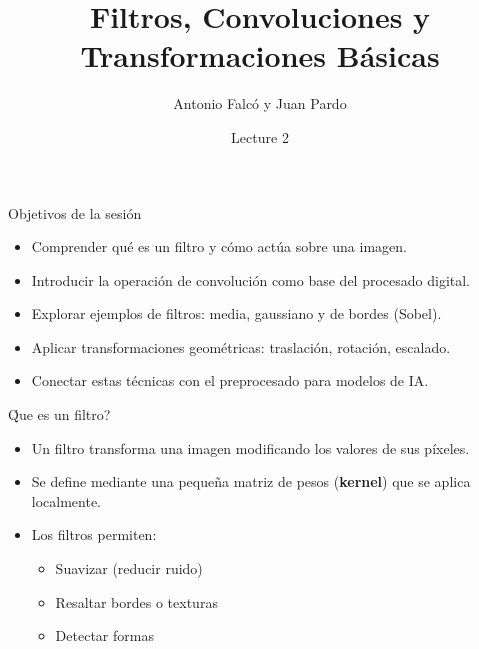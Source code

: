 \documentclass[10pt]{beamer}
\title{Filtros, Convoluciones y Transformaciones B\'asicas}
\author{Antonio Falc\'o y Juan Pardo}
\institute{Introducci\'on a la Inteligencia Artificial}
\date{Lecture 2}
\begin{document}
\begin{frame}
  \titlepage
\end{frame}

\begin{frame}{Objetivos de la sesi\'on}
\begin{itemize}
  \item Comprender qu\'e es un filtro y c\'omo act\'ua sobre una imagen.
  \item Introducir la operaci\'on de convoluci\'on como base del procesado digital.
  \item Explorar ejemplos de filtros: media, gaussiano y de bordes (Sobel).
  \item Aplicar transformaciones geom\'etricas: traslaci\'on, rotaci\'on, escalado.
  \item Conectar estas t\'ecnicas con el preprocesado para modelos de IA.
\end{itemize}
\end{frame}

\begin{frame}{\'Que es un filtro?}
\begin{itemize}
  \item Un filtro transforma una imagen modificando los valores de sus p\'ixeles.
  \item Se define mediante una peque\~na matriz de pesos (\textbf{kernel}) que se aplica localmente.
  \item Los filtros permiten:
  \begin{itemize}
    \item Suavizar (reducir ruido)
    \item Resaltar bordes o texturas
    \item Detectar formas
  \end{itemize}
\end{itemize}
\vspace{3mm}
\centering
{}
\end{frame}
\end{document}

